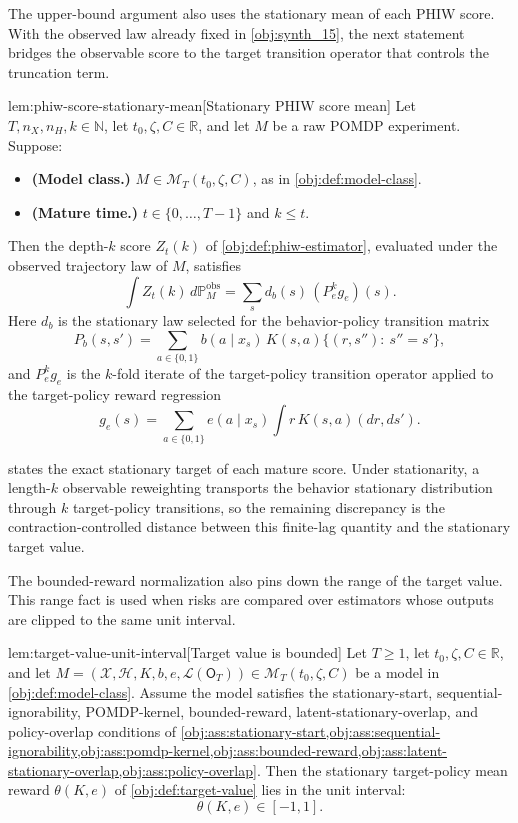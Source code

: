 The upper-bound argument also uses the stationary mean of each PHIW score. With the observed law already fixed in \cref{obj:synth_15}, the next statement bridges the observable score to the target transition operator that controls the truncation term.

\begin{lemmav}{lem:phiw-score-stationary-mean}[Stationary PHIW score mean]
Let \(T,n_X,n_H,k\in\mathbb N\), let \(t_0,\zeta,C\in\mathbb R\), and let \(M\) be a raw POMDP experiment. Suppose:
\begin{itemize}
\item \textbf{(Model class.)} \(M\in\mathcal M_T(t_0,\zeta,C)\), as in \cref{obj:def:model-class}.
\item \textbf{(Mature time.)} \(t\in\{0,\ldots,T-1\}\) and \(k\le t\).
\end{itemize}
Then the depth-\(k\) score \(Z_t(k)\) of \cref{obj:def:phiw-estimator}, evaluated under the observed trajectory law of \(M\), satisfies
\[
\int Z_t(k)\,d\mathbb P_M^{\mathrm{obs}}
=
\sum_s d_b(s)\,(P_e^k g_e)(s).
\]
Here \(d_b\) is the stationary law selected for the behavior-policy transition matrix
\[
P_b(s,s')=\sum_{a\in\{0,1\}} b(a\mid x_s)\,K(s,a)\{(r,s''):\ s''=s'\},
\]
and \(P_e^k g_e\) is the \(k\)-fold iterate of the target-policy transition operator applied to the target-policy reward regression
\[
g_e(s)=\sum_{a\in\{0,1\}} e(a\mid x_s)\int r\,K(s,a)(d r,d s').
\]
\end{lemmav}

 states the exact stationary target of each mature score. Under stationarity, a length-\(k\) observable reweighting transports the behavior stationary distribution through \(k\) target-policy transitions, so the remaining discrepancy is the contraction-controlled distance between this finite-lag quantity and the stationary target value.

The bounded-reward normalization also pins down the range of the target value. This range fact is used when risks are compared over estimators whose outputs are clipped to the same unit interval.

\begin{lemmav}{lem:target-value-unit-interval}[Target value is bounded]
Let \(T\ge 1\), let \(t_0,\zeta,C\in\mathbb R\), and let
\(M=(\mathcal X,\mathcal H,K,b,e,\mathcal L(\mathsf O_T))\in
\mathcal M_T(t_0,\zeta,C)\) be a model in \cref{obj:def:model-class}. Assume the model satisfies the stationary-start, sequential-ignorability, POMDP-kernel, bounded-reward, latent-stationary-overlap, and policy-overlap conditions of
\cref{obj:ass:stationary-start,obj:ass:sequential-ignorability,obj:ass:pomdp-kernel,obj:ass:bounded-reward,obj:ass:latent-stationary-overlap,obj:ass:policy-overlap}. Then the stationary target-policy mean reward \(\theta(K,e)\) of \cref{obj:def:target-value} lies in the unit interval:
\[
\theta(K,e)\in[-1,1].
\]
\end{lemmav}

